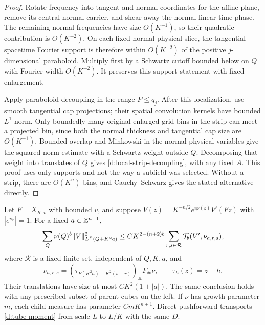 \begin{proof}
Rotate frequency into tangent and normal coordinates for the affine
plane, remove its central normal carrier, and shear away the normal
linear time phase.  The remaining normal frequencies have size
$O(K^{-1})$, so their quadratic contribution is $O(K^{-2})$.
On each fixed normal physical slice, the tangential spacetime Fourier
support is therefore within $O(K^{-2})$ of the positive $j$-dimensional
paraboloid.  Multiply first by a Schwartz cutoff bounded below on $Q$
with Fourier width $O(K^{-2})$.  It preserves this support statement
with fixed enlargement.

Apply paraboloid decoupling \citep{BD2015} in the range $P\le q_j$.
After this localization, use smooth tangential cap projections; their
spatial convolution kernels have bounded $L^1$ norm.  Only boundedly
many original enlarged grid bins in the strip can meet a projected
bin, since both the normal thickness and tangential cap size are
$O(K^{-1})$.  Bounded overlap and Minkowski in the normal physical
variables give the squared-norm estimate with a Schwartz weight
outside $Q$.  Decomposing that weight into translates of $Q$ gives
\eqref{d:local-strip-decoupling}, with any fixed $A$.
This proof uses only supports and not the way a subfield was selected.
Without a strip, there are $O(K^n)$ bins, and Cauchy--Schwarz gives the
stated alternative directly.
\end{proof}

\begin{lemma}
\label{d:transport}
Let $F=X_{K,v}$ with bounded $v$, and suppose
$V(z)=K^{-n/2}e^{i\varphi(z)}V'(Fz)$ with $|e^{i\varphi}|=1$.
For a fixed $a\in\mathbb Z^{n+1}$,
\begin{equation}
 \sum_Q\nu(Q)^b\lVert V\rVert_{L^P(Q+K^2a)}^2
 \le C K^{2-(n+2)b}\sum_{r,s\in\mathcal R}
                 \mathcal T_b(V',\nu_{a,r,s}),
 \label{d:transport-functional}
\end{equation}
where $\mathcal R$ is a fixed finite set, independent of $Q,K,a$, and
\begin{equation}
 \nu_{a,r,s}
  =(\tau_{F(K^2a)+K^2(s-r)})_\# F_\#\nu,
 \qquad \tau_h(z)=z+h.
 \label{d:translated-measures}
\end{equation}
Their translations have size at most $CK^2(1+|a|)$.  The same conclusion
holds with any prescribed subset of parent cubes on the left.
If $\nu$ has growth parameter $m$, each child measure has parameter
$CmK^{n+1}$.  Direct pushforward transports
\eqref{d:tube-moment} from scale $L$ to $L/K$ with the same $D$.
\end{lemma}

